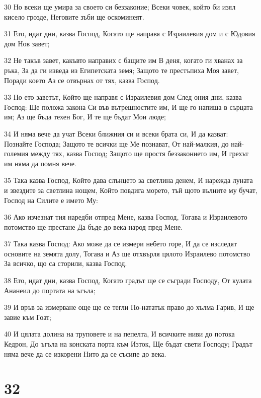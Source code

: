 \par 30 Но всеки ще умира за своето си беззаконие; Всеки човек, който би изял кисело грозде, Неговите зъби ще оскоминеят.
\par 31 Ето, идат дни, казва Господ, Когато ще направя с Израилевия дом и с Юдовия дом Нов завет;
\par 32 Не такъв завет, какъвто направих с бащите им В деня, когато ги хванах за ръка, За да ги изведа из Египетската земя; Защото те престъпиха Моя завет, Поради което Аз се отвърнах от тях, казва Господ.
\par 33 Но ето заветът, Който ще направя с Израилевия дом След ония дни, казва Господ: Ще положа закона Си във вътрешностите им, И ще го напиша в сърцата им; Аз ще бъда техен Бог, И те ще бъдат Мои люде;
\par 34 И няма вече да учат Всеки ближния си и всеки брата си, И да казват: Познайте Господа; Защото те всички ще Ме познават, От най-малкия, до най-големия между тях, казва Господ; Защото ще простя беззаконието им, И грехът им няма да помня вече.
\par 35 Така казва Господ, Който дава слънцето за светлина денем, И нарежда луната и звездите за светлина нощем, Който повдига морето, тъй щото вълните му бучат, Господ на Силите е името Му:
\par 36 Ако изчезнат тия наредби отпред Мене, казва Господ, Тогава и Израилевото потомство ще престане Да бъде до века народ пред Мене.
\par 37 Така казва Господ: Ако може да се измери небето горе, И да се изследят основите на земята долу, Тогава и Аз ще отхвърля цялото Израилево потомство За всичко, що са сторили, казва Господ.
\par 38 Ето, идат дни, казва Господ, Когато градът ще се съгради Господу, От кулата Ананеил до портата на ъгъла;
\par 39 И връв за измерване още ще се тегли По-нататък право до хълма Гарив, И ще завие към Гоат;
\par 40 И цялата долина на труповете и на пепелта, И всичките ниви до потока Кедрон, До ъгъла на конската порта към Изток, Ще бъдат свети Господу; Градът няма вече да се изкорени Нито да се съсипе до века.

\chapter{32}

